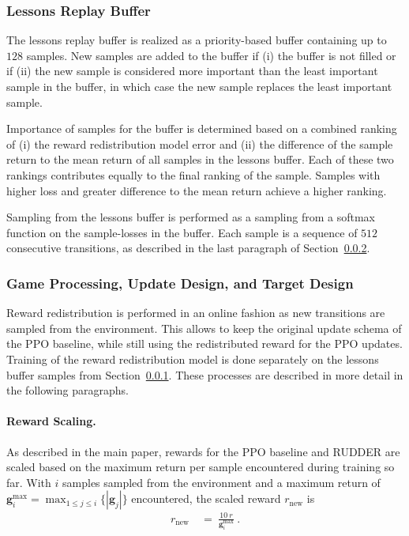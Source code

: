 \documentclass{article}
\newcommand\nn{\mathrm{new}}
\newcommand{\ABS}[1]{{{\left| #1 \right|}}} \newcommand{\BRA}[1]{{{\left\{#1\right\}}}} \newcommand{\NRM}[1]{{{\left\| #1\right\|}}} \newcommand{\PAR}[1]{{{\left(#1\right)}}} \newcommand{\SBRA}[1]{{{\left[#1\right]}}}
\renewcommand{\leq}{\leqslant}
\newcommand{\returnrealization}{\mathbf{g}}
\begin{document}
\begin{appendices}
\subsubsection{Lessons Replay Buffer}
\label{sec:Alessonbuffer}
The lessons replay buffer is realized as
a priority-based buffer
containing up to $128$ samples.
New samples are added to the buffer if (i) the buffer is not filled or
if (ii) the new sample is considered more important than the least important sample in the buffer,
in which case the new sample replaces the least important sample.

Importance of samples for the buffer is determined based on a combined ranking of
(i) the reward redistribution model error and
(ii) the difference of the sample return to the mean return of all samples in the lessons buffer.
Each of these two rankings contributes equally to the final ranking of the sample. Samples with higher loss and greater difference to the mean return achieve a higher ranking.

Sampling from the lessons buffer is performed as a sampling from a softmax function on the sample-losses in the buffer. Each sample is a sequence of $512$ consecutive transitions, as described in the last paragraph of Section~\ref{sec:Aatari-taupdate}.


\subsubsection{Game Processing, Update Design, and Target Design}\label{sec:Aatari-taupdate}
Reward redistribution is performed in an online fashion as new transitions are sampled from the environment. This allows to keep the original update schema of the PPO baseline, while still using the redistributed reward for the PPO updates. Training of the reward redistribution model is done separately on the lessons buffer samples from Section~\ref{sec:Alessonbuffer}. These processes are described in more detail in the following paragraphs.


\paragraph{Reward Scaling.}
As described in the main paper,
rewards for the PPO baseline and RUDDER are scaled based on the maximum return per sample encountered during training so far.
With $i$ samples sampled from the environment
and a maximum return of
$\returnrealization_{i}^{\max} = \max_{1\leq j \leq i}\{\ABS{\returnrealization_j}\}$
encountered, the scaled reward $r_{\nn}$ is
\begin{align}
    r_{\nn} \ &= \ \frac{10 \ r}{\returnrealization_{i}^{\max}} \ .
\end{align}


\end{appendices}
\end{document}
